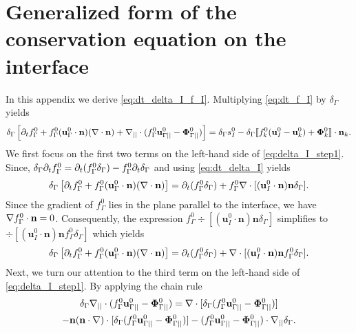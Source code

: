 \section{Generalized form of the conservation equation on the interface}
\label{ap:interface_proof}
In this appendix we derive \ref{eq:dt_delta_I_f_I}. Multiplying \ref{eq:dt_f_I} by $\delta_\Gamma$ yields
\begin{equation}
    \delta_\Gamma
    \left[ \pddt f_\Gamma^0 
    + f_\Gamma^0 (\textbf{u}_\Gamma^0\cdot \textbf{n})  (\div \textbf{n})
    +\divI
    (f_\Gamma^0 \textbf{u}_{\Gamma||}^0
    - \mathbf{\Phi}_{\Gamma||}^0 )
    \right]
    = \delta_\Gamma s_I^0
    - \delta_\Gamma\Jump{
    f_k^0 (\textbf{u}_I^0 - \textbf{u}_k^0)
    + \mathbf{\Phi}_k^0}.
    \label{eq:delta_I_step1}
\end{equation}
We first focus on the first two terms on the left-hand side of \ref{eq:delta_I_step1}. Since, $\delta_\Gamma\partial_t f_\Gamma^0 = \partial_t (f_\Gamma^0\delta_\Gamma) - f_\Gamma^0\partial_t\delta_\Gamma$ and using \ref{eq:dt_delta_I} yields
\begin{equation}
\delta_\Gamma
    \left[ \partial_t f_\Gamma^0 
    + f_\Gamma^0 (\textbf{u}_\Gamma^0\cdot \textbf{n})  (\mathbf{\nabla}\cdot \textbf{n}) \right] = \partial_t (f_\Gamma^0\delta_\Gamma) + f_\Gamma^0\mathbf{\nabla}\cdot [(\textbf{u}_I^0\cdot \textbf{n}) \textbf{n}\delta_\Gamma ].
\end{equation}
Since the gradient of $f_\Gamma^0$ lies in the plane parallel to the interface, we have  $\mathbf{\nabla} f_\Gamma^0 \cdot \textbf{n} = 0$. Consequently, the expression $f_\Gamma^0\div [(\textbf{u}_I^0\cdot \textbf{n}) \textbf{n}\delta_\Gamma ]$ simplifies to $\div [(\textbf{u}_I^0\cdot \textbf{n}) \textbf{n}f_\Gamma^0\delta_\Gamma ]$ which yields 
\begin{equation}
\delta_\Gamma
    \left[ \pddt f_\Gamma^0 
    + f_\Gamma^0 (\textbf{u}_\Gamma^0\cdot \textbf{n})  (\div \textbf{n}) \right] = \pddt (f_\Gamma^0\delta_\Gamma) + \div [(\textbf{u}_I^0\cdot \textbf{n}) \textbf{n}f_\Gamma^0\delta_\Gamma ].
\label{eq:delta_I_step1_2}
\end{equation}
Next, we turn our attention to the third term on the left-hand side of \ref{eq:delta_I_step1}. By applying the chain rule
\begin{multline}
    \delta_\Gamma \divI (f_\Gamma^0 \textbf{u}_{\Gamma||}^0
    - \mathbf{\Phi}_{\Gamma||}^0 ) %
    = 
    \div [\delta_\Gamma (f_\Gamma^0 \textbf{u}_{\Gamma||}^0
    - \mathbf{\Phi}_{\Gamma||}^0 )] \\
    - \textbf{n}(\textbf{n}\cdot\grad)\cdot [\delta_\Gamma (f_\Gamma^0 \textbf{u}_{\Gamma||}^0
    - \mathbf{\Phi}_{\Gamma||}^0 )]
    - (f_\Gamma^0 \textbf{u}_{\Gamma||}^0
    - \mathbf{\Phi}_{\Gamma||}^0 )\cdot\gradI\delta_\Gamma.
\label{eq:delta_I_step2}
\end{multline}
